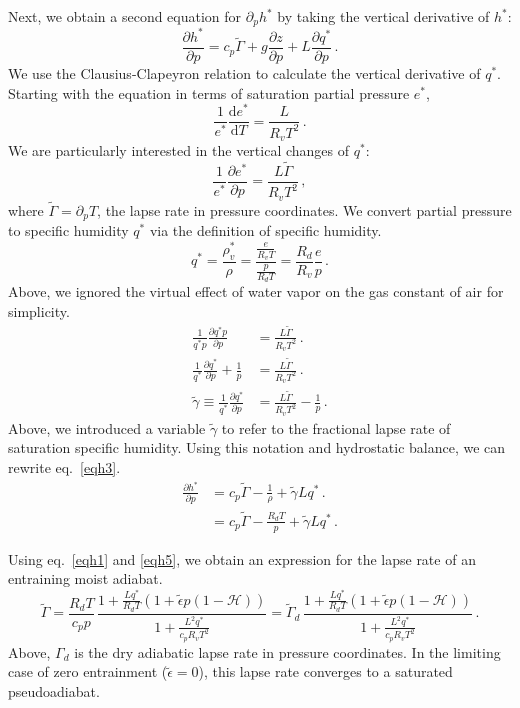 \documentclass{article}
\begin{document}
Next, we obtain a second equation for $\partial_p h^*$ by taking the vertical derivative of $h^*$:
\begin{equation}
\label{eqh3}
\frac{\partial h^*}{\partial p} = c_p\tilde{\Gamma} + g\frac{\partial z}{\partial p} + L\frac{\partial q^*}{\partial p} \, . 
\end{equation}
We use the Clausius-Clapeyron relation to calculate the vertical derivative of $q^*$. Starting with the equation in terms of saturation partial pressure $e^*$,
\begin{equation}
\frac{1}{e^*}\frac{\mathrm{d}e^*}{\mathrm{d}T} = \frac{L}{R_vT^2} \, .
\end{equation}
We are particularly interested in the vertical changes of $q^*$:
\begin{equation}
\frac{1}{e^*}\frac{\partial e^*}{\partial p} = \frac{L\tilde{\Gamma}}{R_vT^2} \, ,
\end{equation}
where $\tilde{\Gamma} = \partial_p T$, the lapse rate in pressure coordinates. We convert partial pressure to specific humidity $q^*$ via the definition of specific humidity.
\begin{equation}
q^* = \frac{\rho_v^*}{\rho} = \frac{\frac{e}{R_vT}}{\frac{p}{R_dT}} = \frac{R_d}{R_v}\frac{e}{p} \, .
\end{equation}
Above, we ignored the virtual effect of water vapor on the gas constant of air for simplicity.
\begin{align}
\frac{1}{q^*p}\frac{\partial q^*p}{\partial p} &= \frac{L\tilde{\Gamma}}{R_vT^2} \, . \\
\frac{1}{q^*}\frac{\partial q^*}{\partial p} + \frac{1}{p} &= \frac{L\tilde{\Gamma}}{R_vT^2} \, . \\
\tilde{\gamma} \equiv \frac{1}{q^*}\frac{\partial q^*}{\partial p} &= \frac{L\tilde{\Gamma}}{R_vT^2} - \frac{1}{p} \, .
\end{align}
Above, we introduced a variable $\tilde{\gamma}$ to refer to the fractional lapse rate of saturation specific humidity. Using this notation and hydrostatic balance, we can rewrite eq.~\ref{eqh3}.
\begin{align}
\label{eqh4}
\frac{\partial h^*}{\partial p} &= c_p\tilde{\Gamma} - \frac{1}{\rho} + \tilde{\gamma} Lq^* \, . \\
\label{eqh5}
&= c_p\tilde{\Gamma} - \frac{R_dT}{p} + \tilde{\gamma} Lq^* \, .
\end{align}

Using eq.~\ref{eqh1} and \ref{eqh5}, we obtain an expression for the lapse rate of an entraining moist adiabat.
\begin{equation}
\label{eqentadb}
\tilde{\Gamma} = \frac{R_dT}{c_pp} \, \frac{1 + \frac{Lq^*}{R_dT}\left( 1 + \tilde{\epsilon}p(1-\mathcal{H}) \right)}{1 + \frac{L^2q^*}{c_pR_vT^2}} = \tilde{\Gamma}_d \, \frac{1 + \frac{Lq^*}{R_dT}\left( 1 + \tilde{\epsilon}p(1-\mathcal{H}) \right)}{1 + \frac{L^2q^*}{c_pR_vT^2}} \, .
\end{equation}
Above, $\Gamma_d$ is the dry adiabatic lapse rate in pressure coordinates. In the limiting case of zero entrainment ($\tilde{\epsilon}=0$), this lapse rate converges to a saturated pseudoadiabat.
\end{document}
